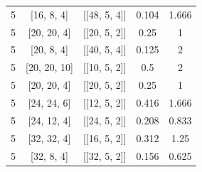 \documentclass[%
reprint,
amsmath,amssymb,
aps,
]{revtex4-2}
\begin{document}
\begin{table}[b]
\begin{ruledtabular}
\begin{tabular}{|c|c|c|c|c|}
	5 & [16, 8, 4] & [[48, 5, 4]] & 0.104 & 1.666  \\
	5 & [20, 20, 4] & [[20, 5, 2]] & 0.25 & 1  \\
	5 & [20, 8, 4] & [[40, 5, 4]] & 0.125 & 2  \\
	5 & [20, 20, 10] & [[10, 5, 2]] & 0.5 & 2  \\
	5 & [20, 20, 4] & [[20, 5, 2]] & 0.25 & 1  \\
	5 & [24, 24, 6] & [[12, 5, 2]] & 0.416 & 1.666 \\
	5 & [24, 12, 4] & [[24, 5, 2]] & 0.208 & 0.833  \\
	5 & [32, 32, 4] & [[16, 5, 2]] & 0.312 & 1.25  \\
	5 & [32, 8, 4] & [[32, 5, 2]] & 0.156 & 0.625   \\
				\end{tabular}
\end{ruledtabular}
\end{table}
\end{document}
